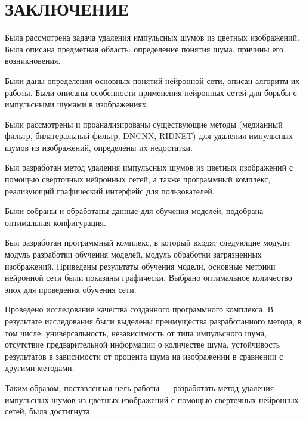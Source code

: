 \section*{ЗАКЛЮЧЕНИЕ}
Была рассмотрена задача удаления импульсных шумов из цветных изображений.
Была описана предметная область: определение понятия шума, причины его возникновения.

Были даны определения основных понятий нейронной сети, описан алгоритм их работы.
Были описаны особенности применения нейронных сетей для борьбы с импульсными шумами в изображениях.

Были рассмотрены и проанализированы существующие методы (медианный фильтр, билатеральный фильтр, DNCNN, RIDNET) для удаления импульсных шумов из изображений, определены их недостатки.

Был разработан метод удаления импульсных шумов из цветных изображений с помощью сверточных нейронных сетей, а также программный комплекс, реализующий графический интерфейс для пользователей.

Были собраны и обработаны данные для обучения моделей, подобрана оптимальная конфигурация.

Был разработан программный комплекс, в который входят следующие модули: модуль разработки обучения моделей, модуль обработки загрязненных изображений.
Приведены результаты обучения модели, основные метрики нейронной сети были показаны графически.
Выбрано оптимальное количество эпох для проведения обучения сети.

Проведено исследование качества созданного программного комплекса.
В результате исследования были выделены преимущества разработанного метода, в том числе: универсальность, независимость от типа импульсного шума, отсутствие предварительной информации о количестве шума, устойчивость результатов в зависимости от процента шума на изображении в сравнении с другими методами.

Таким образом, поставленная цель работы --- разработать метод удаления импульсных шумов из цветных изображений с помощью сверточных нейронных сетей, была достигнута.